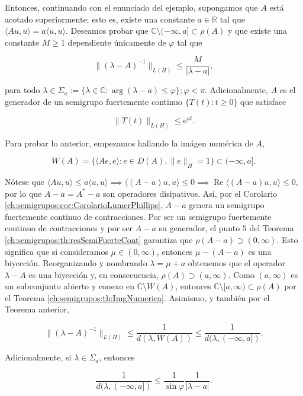 Entonces, continuando con el enunciado del ejemplo, supongamos que $A$ está acotado superiormente; esto es, existe una constante $a \in \mathbb{R}$ tal que $\langle Au, u \rangle = a \langle u, u \rangle$. Deseamos probar que $\mathbb{C} \setminus (-\infty, a] \subset \rho(A)$ y que existe una constante $M \geq 1$ dependiente únicamente de $\varphi$ tal que

\[\lVert (\lambda - A)^{-1}\rVert_{L(H)} \leq \frac{M}{|\lambda - a|},\]

para todo $\lambda \in \Sigma_a := \{\lambda \in \mathbb{C} : \operatorname{arg}(\lambda - a) \leq \varphi\}; \varphi < \pi$. Adicionalmente, $A$ es el generador de un semigrupo fuertemente continuo $\{T(t) : t \geq 0\}$ que satisface

\[\lVert T(t) \rVert_{L(H)} \leq \mathrm{e}^{at}.\]

Para probar lo anterior, empezamos hallando la imágen numérica de $A$,

\[W(A) = \{\langle Ae, e \rangle : e \in D(A), \lVert e \rVert_{H} = 1\} \subset (-\infty, a].\]

Nótese que $\langle Au, u \rangle \leq a\langle u, u \rangle \implies \langle (A - a) u, u \rangle \leq 0 \implies \operatorname{Re}\langle (A - a) u, u \rangle \leq 0,$ por lo que $A-a = A^* - a$ son operadores disipativos. Así, por el Corolario \ref{ch:semigrupos:cor:CorolarioLumerPhillips}, $A-a$ genera un semigrupo fuertemente continuo de contracciones. Por ser un semigrupo fuertemente continuo de contracciones y por ser $A-a$ su generador, el punto $5$ del Teorema \ref{ch:semigrupos:th:resSemiFuerteCont} garantiza que $\rho(A-a) \supset (0, \infty)$. Esto significa que si consideramos $\mu \in (0, \infty)$, entonces $\mu - (A-a)$ es una biyección. Reorganizando y nombrando $\lambda = \mu + a$ obtenemos que el operador $\lambda - A$ es una biyección y, en consecuencia, $\rho(A) \supset (a, \infty)$. Como $(a, \infty)$ es un subconjunto abierto y conexo en $\mathbb{C} \setminus W(A)$, entonces $\mathbb{C} \setminus [a, \infty) \subset \rho(A)$ por el Teorema \ref{ch:semigrupos:th:ImgNumerica}. Asimismo, y también por el Teorema anterior,

\[\lVert (\lambda - A)^{-1} \rVert_{L(H)} \leq \frac{1}{d(\lambda, W(A))} \leq \frac{1}{d(\lambda, (-\infty, a])}.\]

Adicionalmente, si $\lambda \in \Sigma_a$, entonces 

\[\frac{1}{d(\lambda, (-\infty, a])} \leq \frac{1}{\sin \varphi} \frac{1}{|\lambda - a|}.\]

